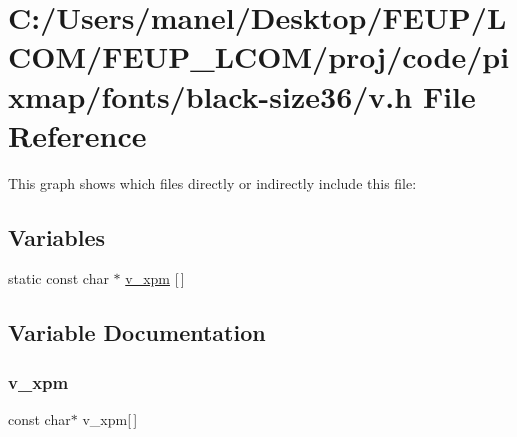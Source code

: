 \hypertarget{black-size36_2v_8h}{}\section{C\+:/\+Users/manel/\+Desktop/\+F\+E\+U\+P/\+L\+C\+O\+M/\+F\+E\+U\+P\+\_\+\+L\+C\+O\+M/proj/code/pixmap/fonts/black-\/size36/v.h File Reference}
\label{black-size36_2v_8h}
This graph shows which files directly or indirectly include this file\+:
\subsection*{Variables}
\begin{DoxyCompactItemize}
\item 
static const char $\ast$ \mbox{\hyperlink{black-size36_2v_8h_ab917132a270491b9862ec1623fc1f82e}{v\+\_\+xpm}} \mbox{[}$\,$\mbox{]}
\end{DoxyCompactItemize}


\subsection{Variable Documentation}
\mbox{\label{black-size36_2v_8h_ab917132a270491b9862ec1623fc1f82e}} 
\subsubsection{\texorpdfstring{v\_xpm}{v\_xpm}}
{\footnotesize\ttfamily const char$\ast$ v\+\_\+xpm\mbox{[}$\,$\mbox{]}\hspace{0.3cm}{\ttfamily [static]}}

